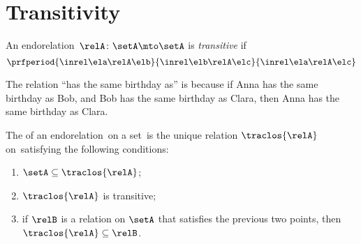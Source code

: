 
\section{Transitivity}

\begin{ctdefinition}
    \label{def:transitive-relation}
    An endorelation~$\relA\colon \setA\mto \setA$ is \emph{transitive} if
    \begin{equation}\label{eq:transitive}
        \prfperiod{
            \inrel \ela \relA \elb
        }{
            \inrel \elb \relA \elc
        }{
            \inrel \ela \relA \elc
        }
    \end{equation}
\end{ctdefinition}

\begin{example}
    The relation ``has the same birthday as'' is  because if Anna has the same birthday as Bob, and Bob has the same birthday as Clara, then Anna has the same birthday as Clara.
\end{example}

\begin{ctdefinition}
    \label{def:transitive-closure}
    The  of an endorelation~\relA on a set~\setA is the unique relation $\traclos{\relA}$ on~\setA satisfying the following conditions: 
    \begin{enumerate}
\item $\setA \subseteq \traclos{\relA}$;
\item $\traclos{\relA}$ is transitive;
\item if $\relB$ is a relation on $\setA$ that satisfies the previous two points, then $\traclos{\relA} \subseteq \relB$. 
\end{enumerate}  
\end{ctdefinition}


